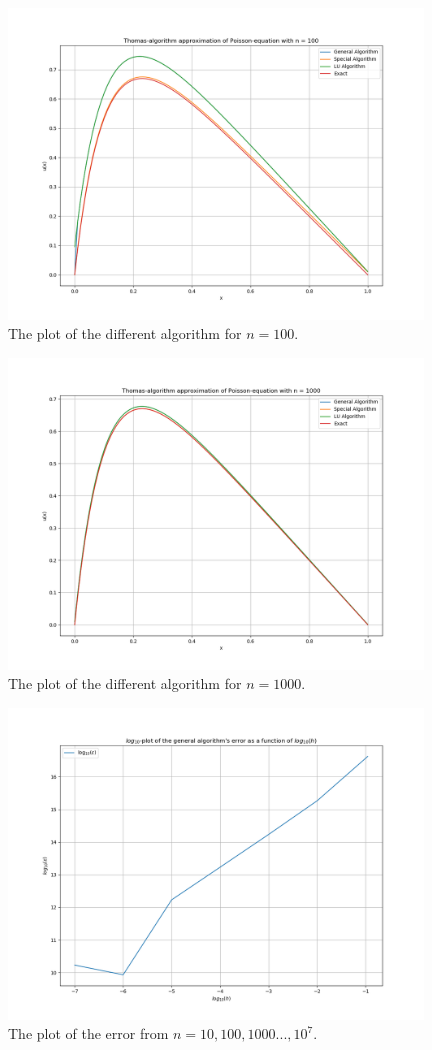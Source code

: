 \documentclass{article}
\begin{document}
\begin{figure}[ht]
	\centering
	\includegraphics[width = 11cm]{program/data100.png}
	\caption{The plot of the different algorithm for $n = 100$. }
	\label{fig:data100png}
\end{figure}

\begin{figure}[ht]
	\centering
	\includegraphics[width = 11cm]{program/data1000.png}
	\caption{The plot of the different algorithm for $n = 1000$. }
	\label{fig:data1000png}
\end{figure}

\begin{figure}[ht]
	\centering
	\includegraphics[width = 11cm]{program/error.png}
	\caption{The plot of the error from $n = 10, 100, 1000 ... , 10^7$. }
	\label{fig:errorpng}
\end{figure}
\end{document}
